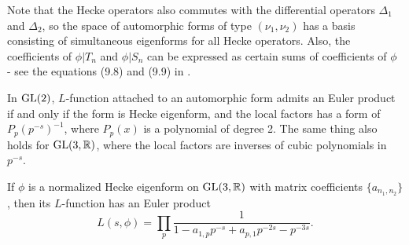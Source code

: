 Note that the Hecke operators also commutes with the differential operators $\Delta_{1}$ and $\Delta_{2}$, so the space of automorphic forms of type $(\nu_{1}, \nu_{2})$ has a basis consisting of simultaneous eigenforms for all Hecke operators.
Also, the coefficients of $\phi|T_{n}$ and $\phi|S_{n}$ can be expressed as certain sums of coefficients of $\phi$ - see the equations (9.8) and (9.9) in \cite{bump2006automorphic}.

In $\operatorname{\mathrm{GL}}(2)$, $L$-function attached to an automorphic form admits an Euler product if and only if the form is Hecke eigenform, and the local factors has a form of $P_{p}(p^{-s})^{-1}$, where $P_{p}(x)$ is a polynomial of degree 2.
The same thing also holds for $\operatorname{\mathrm{GL}}(3, \mathbb{R})$, where the local factors are inverses of cubic polynomials in $p^{-s}$.
\begin{theorem}
If $\phi$ is a normalized Hecke eigenform on $\operatorname{\mathrm{GL}}(3, \mathbb{R})$ with matrix coefficients $\{a_{n_{1}, n_{2}}\}$, then its $L$-function has an Euler product
$$
L(s,\phi) = \prod_{p} \frac{1}{1 - a_{1, p}p^{-s} + a_{p, 1}p^{-2s} - p^{-3s}}.
$$
\end{theorem}



